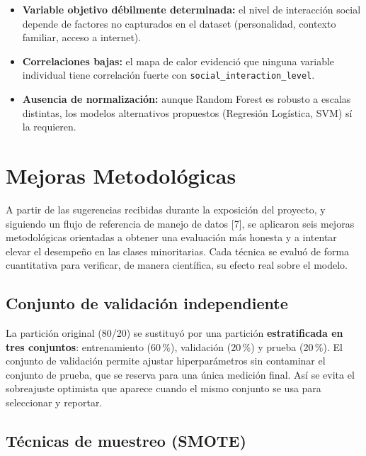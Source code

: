 \documentclass[11pt,twocolumn]{article}
\begin{document}
\begin{itemize}[leftmargin=12pt, itemsep=0pt, parsep=2pt]
  \item \textbf{Variable objetivo d\'ebilmente determinada:} el nivel de
        interacci\'on social depende de factores no capturados en el
        dataset (personalidad, contexto familiar, acceso a internet).
  \item \textbf{Correlaciones bajas:} el mapa de calor evidenci\'o que
        ninguna variable individual tiene correlaci\'on fuerte con
        \texttt{social\_interaction\_level}.
  \item \textbf{Ausencia de normalizaci\'on:} aunque Random Forest es
        robusto a escalas distintas, los modelos alternativos propuestos
        (Regresi\'on Log\'istica, SVM) s\'i la requieren.
\end{itemize}

\section{Mejoras Metodol\'ogicas}

A partir de las sugerencias recibidas durante la exposici\'on del
proyecto, y siguiendo un flujo de referencia de manejo de datos [7],
se aplicaron seis mejoras metodol\'ogicas orientadas a obtener una
evaluaci\'on m\'as honesta y a intentar elevar el desempe\~no en las
clases minoritarias. Cada t\'ecnica se evalu\'o de forma cuantitativa
para verificar, de manera cient\'ifica, su efecto real sobre el modelo.

\subsection{Conjunto de validaci\'on independiente}

La partici\'on original (80/20) se sustituy\'o por una partici\'on
\textbf{estratificada en tres conjuntos}: entrenamiento (60\,\%),
validaci\'on (20\,\%) y prueba (20\,\%). El conjunto de validaci\'on
permite ajustar hiperpar\'ametros sin contaminar el conjunto de prueba,
que se reserva para una \'unica medici\'on final. As\'i se evita el
sobreajuste optimista que aparece cuando el mismo conjunto se usa para
seleccionar y reportar.

\subsection{T\'ecnicas de muestreo (SMOTE)}
\end{document}
